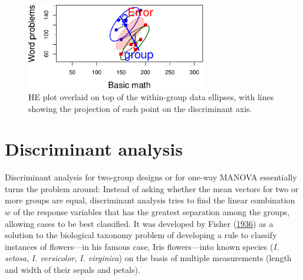\documentclass[
  letterpaper,
  10pt,
  krantz2]{krantz}
\makeatletter
\newenvironment{Shaded}{\begin{snugshade}}{\end{snugshade}}
\newcommand{\AttributeTok}[1]{\textcolor[rgb]{0.40,0.45,0.13}{#1}}
\newcommand{\ControlFlowTok}[1]{\textcolor[rgb]{0.00,0.23,0.31}{#1}}
\newcommand{\DecValTok}[1]{\textcolor[rgb]{0.68,0.00,0.00}{#1}}
\newcommand{\FloatTok}[1]{\textcolor[rgb]{0.68,0.00,0.00}{#1}}
\newcommand{\FunctionTok}[1]{\textcolor[rgb]{0.28,0.35,0.67}{#1}}
\newcommand{\NormalTok}[1]{\textcolor[rgb]{0.00,0.23,0.31}{#1}}
\newcommand{\OtherTok}[1]{\textcolor[rgb]{0.00,0.23,0.31}{#1}}
\newcommand{\SpecialCharTok}[1]{\textcolor[rgb]{0.37,0.37,0.37}{#1}}
\newcommand{\StringTok}[1]{\textcolor[rgb]{0.13,0.47,0.30}{#1}}
\newenvironment{kframe}{%
  \medskip{}
  \setlength{\fboxsep}{.8em}
  \def\at@end@of@kframe{}%
  \ifinner\ifhmode%
  \def\at@end@of@kframe{\end{minipage}}%
  \begin{minipage}{\columnwidth}%
  \fi\fi%
  \def\FrameCommand##1{\hskip\@totalleftmargin \hskip-\fboxsep
  \colorbox{shadecolor}{##1}\hskip-\fboxsep
      \hskip-\linewidth \hskip-\@totalleftmargin \hskip\columnwidth}%
  \MakeFramed {\advance\hsize-\width
    \@totalleftmargin\z@ \linewidth\hsize
    \@setminipage}}%
{\par\unskip\endMakeFramed%
  \at@end@of@kframe}
\renewenvironment{Shaded}{\begin{kframe}}{\end{kframe}}
\makeatother
\begin{document}
\begin{Shaded}
\end{Shaded}

\begin{figure}[H]

{\centering \includegraphics[width=0.7\textwidth,height=\textheight]{figs/fig-mathscore-HE-overlay-1.pdf}

}

\caption{\label{fig-mathscore-HE-overlay}HE plot overlaid on top of the
within-group data ellipses, with lines showing the projection of each
point on the discriminant axis.}

\end{figure}

\hypertarget{discriminant-analysis}{%
\section{Discriminant analysis}\label{discriminant-analysis}}

Discriminant analysis for two-group designs or for one-way MANOVA
essentially turns the problem around: Instead of asking whether the mean
vectors for two or more groups are equal, discriminant analysis tries to
find the linear combination \(w\) of the response variables that has the
greatest separation among the groups, allowing cases to be best
classified. It was developed by Fisher
(\protect\hyperlink{ref-Fisher:1936}{1936}) as a solution to the
biological taxonomy problem of developing a rule to classify instances
of flowers---in his famous case, Iris flowers---into known species
(\emph{I. setosa}, \emph{I. versicolor}, \emph{I. virginica}) on the
basis of multiple measurements (length and width of their sepals and
petals).
\end{document}
